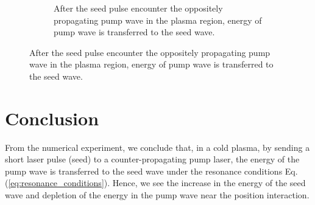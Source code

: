 \documentclass{article}
\begin{document}
\begin{figure} [H]
\begin{subfigure}[b]{0.5\textwidth}
            \caption{ After the seed pulse encounter the oppositely propagating pump wave in the plasma region, energy of pump wave is transferred to the seed wave.}    
        \end{subfigure}
    \end{figure}

    \section{Conclusion}
    From the numerical experiment, we conclude that, in a cold plasma, by sending a short laser pulse (seed) to a counter-propagating pump laser, the energy of the pump wave is transferred to the seed wave under the resonance conditions Eq.(\ref{eq:resonance_conditions}). Hence, we see the increase in the energy of the seed wave and depletion of the energy in the pump wave near the position interaction. 

    \nocite{*}
    
    
\end{document}
